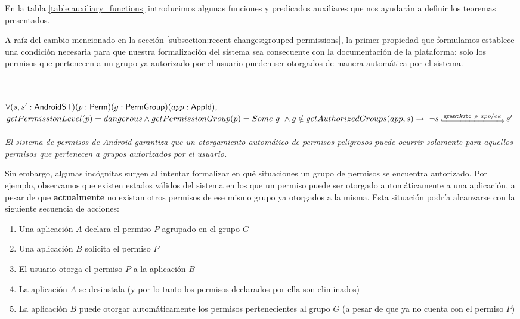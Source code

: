 En la tabla \ref{table:auxiliary_functions} introducimos algunas funciones y predicados auxiliares
que nos ayudarán a definir los teoremas presentados.



A raíz del cambio mencionado en la sección \ref{subsection:recent-changes:grouped-permissions}, la
primer propiedad que formulamos establece una condición necesaria para que nuestra formalización del
sistema sea consecuente con la documentación de la plataforma: solo los permisos que pertenecen a un
grupo ya autorizado por el usuario pueden ser otorgados de manera automática por el sistema.

\begin{prop} \label{section:formalization:property1} \mbox{} \\ \\
    $\forall (s,s': \mathsf{AndroidST}) (p:\mathsf{Perm}) (g:\mathsf{PermGroup}) (app:\mathsf{AppId}),$ \\
    $getPermissionLevel(p) = dangerous \land getPermissionGroup(p) = Some\ g\ \land g \notin
        getAuthorizedGroups(app,s) \rightarrow\ \neg
        \Mathexecrel{s}{\texttt{grantAuto}~p~app/ok}{s'}$ \\ \\
    \textit{El sistema de permisos de Android garantiza que un otorgamiento automático de permisos peligrosos puede ocurrir solamente para aquellos permisos que pertenecen a grupos autorizados por el usuario.}
\end{prop}

Sin embargo, algunas incógnitas surgen al intentar formalizar en qué situaciones un grupo de
permisos se encuentra autorizado. Por ejemplo, observamos que existen estados válidos del sistema en
los que un permiso puede ser otorgado automáticamente a una aplicación, a pesar de que
\textbf{actualmente} no existan otros permisos de ese mismo grupo ya otorgados a la misma. Esta
situación podría alcanzarse con la siguiente secuencia de acciones:

\begin{enumerate}
    \item Una aplicación $A$ declara el permiso $P$ agrupado en el grupo $G$
    \item Una aplicación $B$ solicita el permiso $P$
    \item El usuario otorga el permiso $P$ a la aplicación $B$
    \item La aplicación $A$ se desinstala (y por lo tanto los permisos declarados por ella son
          eliminados)
    \item La aplicación $B$ puede otorgar automáticamente los permisos pertenecientes al grupo $G$
          (a pesar de que ya no cuenta con el permiso $P$)
\end{enumerate}

